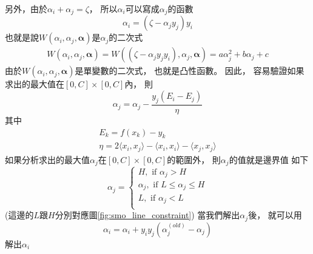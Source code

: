   另外，由於$\alpha_i + \alpha_j = \zeta$，
  所以$\alpha_i$可以寫成$\alpha_j$的函數
  \begin{equation}
    \alpha_i = (\zeta - \alpha_j y_j) y_i
  \end{equation}
  也就是說$W(\alpha_i, \alpha_j, \mathbf{\alpha})$是$\alpha_j$的二次式
  \begin{equation}
    \begin{split}
      W(\alpha_i, \alpha_j, \mathbf{\alpha}) 
      = W((\zeta - \alpha_j y_j y_i), \alpha_j, \mathbf{\alpha})
      = a \alpha_j^2 + b \alpha_j + c
    \end{split}
  \end{equation}
  由於$W(\alpha_i, \alpha_j, \mathbf{\alpha})$是單變數的二次式，
  也就是凸性函數。
  因此，
  容易驗證如果求出的最大值在$[0, C] \times [0, C]$內，
  則
  \begin{equation}
    \alpha_j = \alpha_j - \frac{y_j (E_i - E_j)}{\eta}
  \end{equation}
  其中
  \begin{align}
    E_k = f(x_k) - y_k \\
    \eta = 2 \langle x_i, x_j \rangle - \langle x_i, x_i \rangle - \langle x_j, x_j \rangle
  \end{align}
  如果分析求出的最大值$\alpha_j$在$[0, C] \times [0, C]$的範圍外，
  則$\alpha_j$的值就是邊界值
  如下 
  \begin{equation}
    \alpha_j = 
    \left\{
    \begin{array}{l}
      H,\text{ if } \alpha_j > H \\
      \alpha_j, \text{ if } L \leq \alpha_j \leq H \\
      L, \text{ if } \alpha_j < L \\
    \end{array}
    \right.
  \end{equation}
  (這邊的$L$跟$H$分別對應圖\ref{fig:smo_line_constraint})
  當我們解出$\alpha_j$後，
  就可以用
  \begin{equation}
    \alpha_i = \alpha_i + y_i y_j (\alpha_j^{(old)} - \alpha_j)
  \end{equation}
  解出$\alpha_i$

